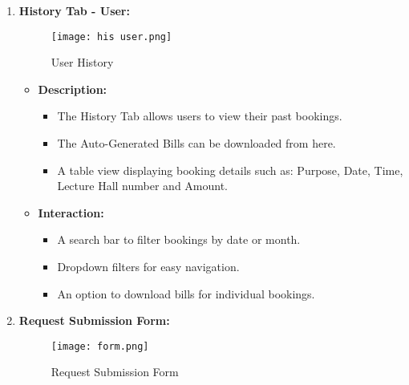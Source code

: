 \documentclass[a4paper,12pt]{article}
\begin{document}
\begin{enumerate} [label=\Roman*.]
\begin{itemize}
\begin{itemize}
            \item Live Schedule
            \item Drop-down menus, clickable cards, and quick navigation buttons.
            \item Notifications area for updates.
        \end{itemize}    
    \end{itemize}

    \clearpage
    
  
    \item \textbf{History Tab - User:} 
      \begin{figure}[h!]
    \centering
    \texttt{[image: his user.png]} 
    \caption{User History}
    \label{history}
\end{figure}
    
    
    \begin{itemize}
        \item \textbf{Description:}
        \begin{itemize}
            \item The History Tab allows users to view their past bookings. 
            \item The Auto-Generated Bills can be downloaded from here.
            \item A table view displaying booking details such as: Purpose, Date, Time, Lecture Hall number and Amount.
        \end{itemize}
        \item \textbf{Interaction:}
        \begin{itemize}
            \item A search bar to filter bookings by date or month.
            \item Dropdown filters for easy navigation.
            \item An option to download bills for individual bookings.
        \end{itemize}
    \end{itemize}
\clearpage

    
    \item \textbf{Request Submission Form:}
    \begin{figure}[h!]
    \centering
    \texttt{[image: form.png]} 
    \caption{Request Submission Form}
    \label{form}
\end{figure}
    

\end{enumerate}
\end{document}
